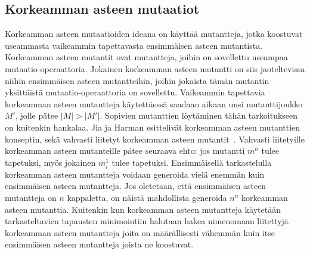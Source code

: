 \documentclass{tktltiki}
\begin{document}
\subsection{Korkeamman asteen mutaatiot}
Korkeamman asteen mutaatioiden ideana on käyttää mutantteja, jotka koostuvat useammasta vaikeammin tapettavasta ensimmäisen asteen mutantista. Korkeamman asteen mutantit ovat mutantteja, joihin on sovellettu useampaa mutaatio-operaattoria. Jokainen korkeamman asteen mutantti on siis jaoteltevissa niihin ensimmäisen asteen mutantteihin, joihin jokaista tämän mutantin yksittäistä mutaatio-operaattoria on sovellettu. Vaikeammin tapettavia korkeamman asteen mutantteja käytettäessä saadaan aikaan uusi mutanttijoukko $M'$, jolle pätee $|M| > |M'|$. Sopivien mutanttien löytäminen tähän tarkoitukseen on kuitenkin hankalaa. Jia ja Harman esittelivät korkeamman asteen mutanttien konseptin, sekä vahvasti liitetyt korkeamman asteen mutantit~\cite{JiaH08b}. Vahvasti liitetyille korkeamman asteen mutanteille pätee seuraava ehto: jos mutantti $m^h$ tulee tapetuksi, myös jokainen $m^1_i$ tulee tapetuksi. Ensimmäisellä tarkastelulla korkeamman asteen mutantteja voidaan generoida vielä enemmän kuin ensimmäisen asteen mutantteja. Jos oletetaan, että ensimmäisen asteen mutantteja on $n$ kappaletta, on näistä mahdollista generoida $n^n$ korkeamman asteen mutanttia. Kuitenkin kun korkeamman asteen mutantteja käytetään tarkasteltavien tapausten minimointiin halutaan hakea nimenomaan liitettyjä korkeamman asteen mutantteja joita on määrällisesti vähemmän kuin itse ensimmäisen asteen mutantteja joista ne koostuvat. 
\end{document}
